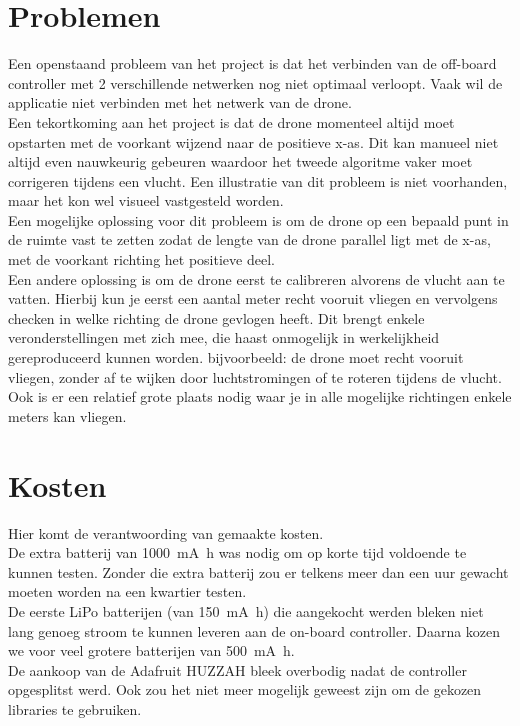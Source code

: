 \section{Problemen} \label{sec:problems}
Een openstaand probleem van het project is dat het verbinden van de off-board controller met 2 verschillende netwerken nog niet optimaal verloopt. Vaak wil de applicatie niet verbinden met het netwerk van de drone.\\

Een tekortkoming aan het project is dat de drone momenteel altijd moet opstarten met de voorkant wijzend naar de positieve x-as.
Dit kan manueel niet altijd even nauwkeurig gebeuren waardoor het tweede algoritme vaker moet corrigeren tijdens een vlucht.
Een illustratie van dit probleem is niet voorhanden, maar het kon wel visueel vastgesteld worden.\\
Een mogelijke oplossing voor dit probleem is om de drone op een bepaald punt in de ruimte vast te zetten zodat de lengte van de drone parallel ligt met de x-as, met de voorkant richting het positieve deel.\\
Een andere oplossing is om de drone eerst te calibreren alvorens de vlucht aan te vatten.
Hierbij kun je eerst een aantal meter recht vooruit vliegen en vervolgens checken in welke richting de drone gevlogen heeft.
Dit brengt enkele veronderstellingen met zich mee, die haast onmogelijk in werkelijkheid gereproduceerd kunnen worden.
bijvoorbeeld: de drone moet recht vooruit vliegen, zonder af te wijken door luchtstromingen of te roteren tijdens de vlucht.
Ook is er een relatief grote plaats nodig waar je in alle mogelijke richtingen enkele meters kan vliegen.\\

\section{Kosten}
Hier komt de verantwoording van gemaakte kosten.\\
De extra batterij van \SI{1000}{\mA\hour} was nodig om op korte tijd voldoende te kunnen testen. Zonder die extra batterij zou er telkens meer dan een uur gewacht moeten worden na een kwartier testen.\\
De eerste LiPo batterijen (van \SI{150}{\mA\hour}) die aangekocht werden bleken niet lang genoeg stroom te kunnen leveren aan de on-board controller. Daarna kozen we voor veel grotere batterijen van \SI{500}{\mA\hour}.\\
De aankoop van de Adafruit HUZZAH bleek overbodig nadat de controller opgesplitst werd. Ook zou het niet meer mogelijk geweest zijn om de gekozen libraries te gebruiken.\\

